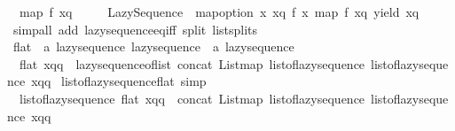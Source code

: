 \begin{isabellebody}
\ \ {\isachardoublequoteopen}map\ f\ xq\ {\isacharequal}{\kern0pt}\isanewline
\ \ \ \ Lazy{\isacharunderscore}{\kern0pt}Sequence\ {\isacharparenleft}{\kern0pt}{\isasymlambda}{\isacharunderscore}{\kern0pt}{\isachardot}{\kern0pt}\ map{\isacharunderscore}{\kern0pt}option\ {\isacharparenleft}{\kern0pt}{\isasymlambda}{\isacharparenleft}{\kern0pt}x{\isacharcomma}{\kern0pt}\ xq{\isacharprime}{\kern0pt}{\isacharparenright}{\kern0pt}{\isachardot}{\kern0pt}\ {\isacharparenleft}{\kern0pt}f\ x{\isacharcomma}{\kern0pt}\ map\ f\ xq{\isacharprime}{\kern0pt}{\isacharparenright}{\kern0pt}{\isacharparenright}{\kern0pt}\ {\isacharparenleft}{\kern0pt}yield\ xq{\isacharparenright}{\kern0pt}{\isacharparenright}{\kern0pt}{\isachardoublequoteclose}\isanewline
%
\isadelimproof
\ \ %
\endisadelimproof
%
\isatagproof
{}\isamarkupfalse%
\ {\isacharparenleft}{\kern0pt}simp{\isacharunderscore}{\kern0pt}all\ add{\isacharcolon}{\kern0pt}\ lazy{\isacharunderscore}{\kern0pt}sequence{\isacharunderscore}{\kern0pt}eq{\isacharunderscore}{\kern0pt}iff\ split{\isacharcolon}{\kern0pt}\ list{\isachardot}{\kern0pt}splits{\isacharparenright}{\kern0pt}%
\endisatagproof
{\isafoldproof}%
%
\isadelimproof
\isanewline
%
\endisadelimproof
\isanewline
{}\isamarkupfalse%
\ flat\ {\isacharcolon}{\kern0pt}{\isacharcolon}{\kern0pt}\ {\isachardoublequoteopen}{\isacharprime}{\kern0pt}a\ lazy{\isacharunderscore}{\kern0pt}sequence\ lazy{\isacharunderscore}{\kern0pt}sequence\ {\isasymRightarrow}\ {\isacharprime}{\kern0pt}a\ lazy{\isacharunderscore}{\kern0pt}sequence{\isachardoublequoteclose}\isanewline
{}\isanewline
\ \ {\isachardoublequoteopen}flat\ xqq\ {\isacharequal}{\kern0pt}\ lazy{\isacharunderscore}{\kern0pt}sequence{\isacharunderscore}{\kern0pt}of{\isacharunderscore}{\kern0pt}list\ {\isacharparenleft}{\kern0pt}concat\ {\isacharparenleft}{\kern0pt}List{\isachardot}{\kern0pt}map\ list{\isacharunderscore}{\kern0pt}of{\isacharunderscore}{\kern0pt}lazy{\isacharunderscore}{\kern0pt}sequence\ {\isacharparenleft}{\kern0pt}list{\isacharunderscore}{\kern0pt}of{\isacharunderscore}{\kern0pt}lazy{\isacharunderscore}{\kern0pt}sequence\ xqq{\isacharparenright}{\kern0pt}{\isacharparenright}{\kern0pt}{\isacharparenright}{\kern0pt}{\isachardoublequoteclose}\isanewline
\isanewline
{}\isamarkupfalse%
\ list{\isacharunderscore}{\kern0pt}of{\isacharunderscore}{\kern0pt}lazy{\isacharunderscore}{\kern0pt}sequence{\isacharunderscore}{\kern0pt}flat\ {\isacharbrackleft}{\kern0pt}simp{\isacharbrackright}{\kern0pt}{\isacharcolon}{\kern0pt}\isanewline
\ \ {\isachardoublequoteopen}list{\isacharunderscore}{\kern0pt}of{\isacharunderscore}{\kern0pt}lazy{\isacharunderscore}{\kern0pt}sequence\ {\isacharparenleft}{\kern0pt}flat\ xqq{\isacharparenright}{\kern0pt}\ {\isacharequal}{\kern0pt}\ concat\ {\isacharparenleft}{\kern0pt}List{\isachardot}{\kern0pt}map\ list{\isacharunderscore}{\kern0pt}of{\isacharunderscore}{\kern0pt}lazy{\isacharunderscore}{\kern0pt}sequence\ {\isacharparenleft}{\kern0pt}list{\isacharunderscore}{\kern0pt}of{\isacharunderscore}{\kern0pt}lazy{\isacharunderscore}{\kern0pt}sequence\ xqq{\isacharparenright}{\kern0pt}{\isacharparenright}{\kern0pt}{\isachardoublequoteclose}\isanewline

\end{isabellebody}
